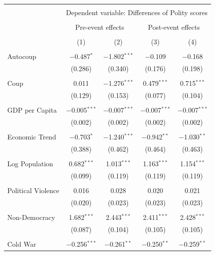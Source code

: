 \documentclass[
  12pt,
]{report}
\begin{document}
\begin{table}
{\begin{tabular}{@{\extracolsep{30pt}}lcccc} 
\\[-1.8ex]\hline 
\hline \\[-1.8ex] 
 & \multicolumn{4}{c}{Dependent variable: Differences of Polity scores} \\ 
\cline{2-5} 
\\[-1.8ex] & \multicolumn{2}{c}{Pre-event effects} & \multicolumn{2}{c}{Post-event effects} \\ 
\\[-1.8ex] & (1) & (2) & (3) & (4)\\ 
\hline \\[-1.8ex] 
 Autocoup & $-$0.487$^{*}$ & $-$1.802$^{***}$ & $-$0.109 & $-$0.168 \\ 
  & (0.286) & (0.340) & (0.176) & (0.198) \\ 
  & & & & \\ 
 Coup & 0.011 & $-$1.276$^{***}$ & 0.479$^{***}$ & 0.715$^{***}$ \\ 
  & (0.129) & (0.153) & (0.077) & (0.104) \\ 
  & & & & \\ 
 GDP per Capita & $-$0.005$^{***}$ & $-$0.007$^{***}$ & $-$0.007$^{***}$ & $-$0.007$^{***}$ \\ 
  & (0.002) & (0.002) & (0.002) & (0.002) \\ 
  & & & & \\ 
 Economic Trend & $-$0.703$^{*}$ & $-$1.240$^{***}$ & $-$0.942$^{**}$ & $-$1.030$^{**}$ \\ 
  & (0.388) & (0.462) & (0.464) & (0.463) \\ 
  & & & & \\ 
 Log Population & 0.682$^{***}$ & 1.013$^{***}$ & 1.163$^{***}$ & 1.154$^{***}$ \\ 
  & (0.099) & (0.119) & (0.119) & (0.119) \\ 
  & & & & \\ 
 Political Violence & 0.016 & 0.028 & 0.020 & 0.021 \\ 
  & (0.020) & (0.023) & (0.023) & (0.023) \\ 
  & & & & \\ 
 Non-Democracy & 1.682$^{***}$ & 2.443$^{***}$ & 2.411$^{***}$ & 2.428$^{***}$ \\ 
  & (0.087) & (0.104) & (0.105) & (0.105) \\ 
  & & & & \\ 
 Cold War & $-$0.256$^{***}$ & $-$0.261$^{**}$ & $-$0.250$^{**}$ & $-$0.259$^{**}$ \\ 

\end{tabular}}
\end{table}
\end{document}
